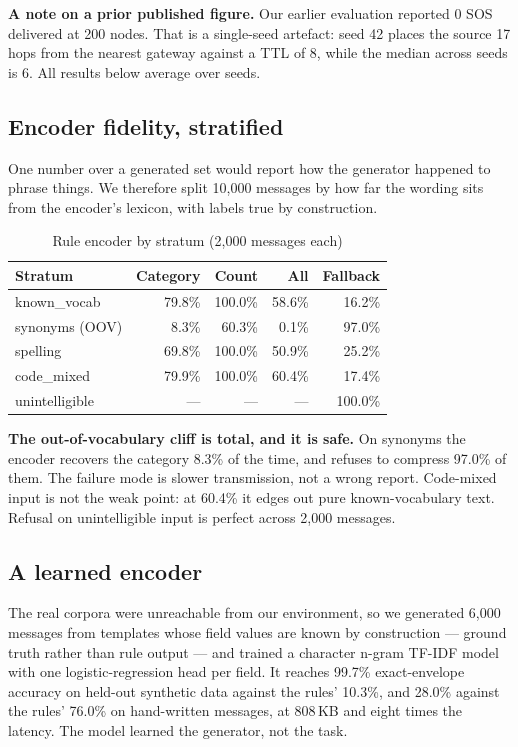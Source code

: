 \documentclass[conference]{IEEEtran}
\begin{document}
\textbf{A note on a prior published figure.} Our earlier evaluation reported 0
SOS delivered at 200 nodes. That is a single-seed artefact: seed 42 places the
source 17 hops from the nearest gateway against a TTL of 8, while the median
across seeds is 6. All results below average over seeds.

\subsection{Encoder fidelity, stratified}
\label{sec:fidelity}
One number over a generated set would report how the generator happened to
phrase things. We therefore split 10{,}000 messages by how far the wording sits
from the encoder's lexicon, with labels true by construction.

\begin{table}[htbp]
\caption{Rule encoder by stratum (2{,}000 messages each)}
\begin{center}
\begin{tabular}{lrrrr}
\toprule
\textbf{Stratum} & \textbf{Category} & \textbf{Count} & \textbf{All} & \textbf{Fallback} \\
\midrule
known\_vocab      & 79.8\% & 100.0\% & 58.6\% & 16.2\% \\
synonyms (OOV)    &  8.3\% &  60.3\% &  0.1\% & 97.0\% \\
spelling          & 69.8\% & 100.0\% & 50.9\% & 25.2\% \\
code\_mixed       & 79.9\% & 100.0\% & 60.4\% & 17.4\% \\
unintelligible    & ---    & ---     & ---    & 100.0\% \\
\bottomrule
\end{tabular}
\label{tab:strata}
\end{center}
\end{table}

\textbf{The out-of-vocabulary cliff is total, and it is safe.} On synonyms the
encoder recovers the category 8.3\% of the time, and refuses to compress 97.0\%
of them. The failure mode is slower transmission, not a wrong report.
Code-mixed input is not the weak point: at 60.4\% it edges out pure
known-vocabulary text. Refusal on unintelligible input is perfect across 2{,}000
messages.

\subsection{A learned encoder}
The real corpora were unreachable from our environment, so we generated 6{,}000
messages from templates whose field values are known by construction --- ground
truth rather than rule output --- and trained a character n-gram TF-IDF model
with one logistic-regression head per field. It reaches 99.7\% exact-envelope
accuracy on held-out synthetic data against the rules' 10.3\%, and 28.0\%
against the rules' 76.0\% on hand-written messages, at 808\,KB and eight times
the latency. The model learned the generator, not the task.
\end{document}
